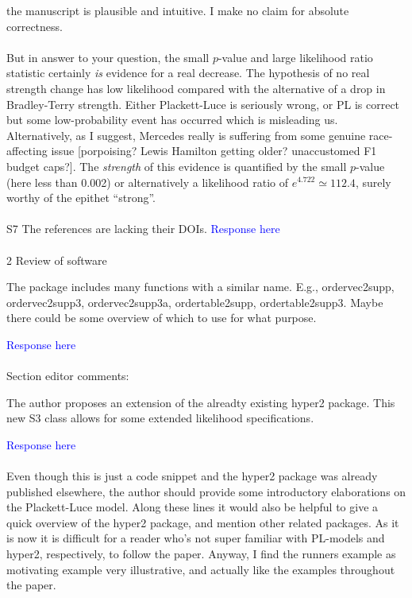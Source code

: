 \documentclass[12pt]{article}
\begin{document}
{  the manuscript is plausible and intuitive.  I make no claim for
  absolute correctness.\\ \\ But in answer to your question, the small
  $p$-value and large likelihood ratio statistic certainly {\em is}
  evidence for a real decrease.  The hypothesis of no real strength
  change has low likelihood compared with the alternative of a drop in
  Bradley-Terry strength.  Either Plackett-Luce is seriously wrong, or
  PL is correct but some low-probability event has occurred which is
  misleading us.  Alternatively, as I suggest, Mercedes really is
  suffering from some genuine race-affecting issue [porpoising? Lewis
    Hamilton getting older?  unaccustomed F1 budget caps?].  The {\em
    strength} of this evidence is quantified by the small $p$-value
  (here less than 0.002) or alternatively a likelihood ratio of
  $e^{4.722}\simeq 112.4$, surely worthy of the epithet
  ``strong''.}\\ \\

S7 The references are lacking their DOIs.
\textcolor{blue}{Response here}\\ \\

2 Review of software

The package includes many functions with a similar name. E.g., ordervec2supp,
ordervec2supp3, ordervec2supp3a, ordertable2supp, ordertable2supp3. Maybe
there could be some overview of which to use for what purpose.

\textcolor{blue}{Response here}\\ \\

Section editor comments:

The author proposes an extension of the alreadty existing hyper2 package.
This new S3 class allows for some extended likelihood specifications.

\textcolor{blue}{Response here}\\ \\


Even though this is just a code snippet and the hyper2 package was already
published elsewhere, the author should provide some introductory elaborations
on the Plackett-Luce model. Along these lines it would also be helpful to give
a quick overview of the hyper2 package, and mention other related packages. As it
is now it is difficult for a reader who's not super familiar with PL-models and
hyper2, respectively, to follow the paper. Anyway, I find the runners example
as motivating example very illustrative, and actually like the examples throughout
the paper.
\end{document}
